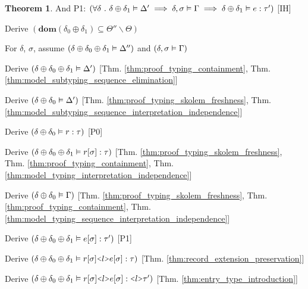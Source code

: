 \documentclass[acmsmall]{acmart}
\theoremstyle{definition}
\newtheorem{theorem}{Theorem}[section]
\begin{document}
\begin{theorem}
  \item \I \N And P1: $(
    \forall \delta \ .\  
    \delta \oplus \delta_1 \vDash \Delta'
    \implies 
    \delta, \sigma \vDash \Gamma
    \implies 
    \delta \oplus \delta_1 \vDash e : \tau'
  )$ [IH]

  \item \I \N Derive $(
    \textbf{dom}(\delta_0 \oplus \delta_1) \subseteq \Theta'' \backslash \Theta
  )$ 

  \item \I \N For $\delta$, $\sigma$,
    assume $(\delta \oplus \delta_0 \oplus \delta_1 \vDash \Delta'')$
    and $(\delta, \sigma \vDash \Gamma)$

  \item \I\I \N Derive $(
    \delta \oplus \delta_0 \oplus \delta_1 \vDash \Delta'
  )$ [Thm. \ref{thm:proof_typing_containment}, Thm. \ref{thm:model_subtyping_sequence_elimination}]
  \item \I\I \N Derive $(
    \delta \oplus \delta_0 \vDash \Delta'
  )$ [Thm. \ref{thm:proof_typing_skolem_freshness}, Thm. \ref{thm:model_subtyping_sequence_interpretation_independence}]
  \item \I\I \N Derive $(
    \delta \oplus \delta_0 \vDash r : \tau
  )$ [P0]
  \item \I\I \N Derive $(
    \delta \oplus \delta_0 \oplus \delta_1 \vDash r[\sigma] : \tau
  )$ [Thm. \ref{thm:proof_typing_skolem_freshness}, 
      Thm. \ref{thm:proof_typing_containment},
      Thm. \ref{thm:model_typing_interpretation_independence}]

  \item \I\I \N Derive $(
    \delta \oplus \delta_0 \vDash \Gamma
  )$ [Thm. \ref{thm:proof_typing_skolem_freshness},
      Thm. \ref{thm:proof_typing_containment},
      Thm. \ref{thm:model_typing_sequence_interpretation_independence}]

  \item \I\I \N Derive $(
    \delta \oplus \delta_0 \oplus \delta_1 \vDash e[\sigma] : \tau'
  )$ [P1]

  \item \I\I \N Derive $(
    \delta \oplus \delta_0 \oplus \delta_1 \satisfies r[\sigma]\J{<}l\J{>}e[\sigma] \hastype \tau
  )$ [Thm. \ref{thm:record_extension_preservation}]

  \item \I\I \N Derive $(
    \delta \oplus \delta_0 \oplus \delta_1 \satisfies r[\sigma]\J{<}l\J{>}e[\sigma] \hastype \J{<}l\J{>}\tau'
  )$ [Thm. \ref{thm:entry_type_introduction}]


\end{theorem}
\end{document}
